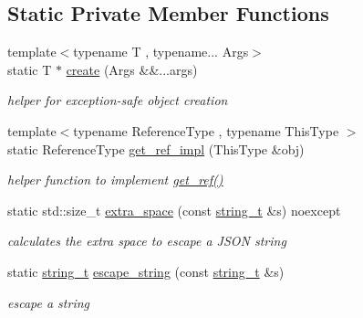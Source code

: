 \subsection*{Static Private Member Functions}
\begin{DoxyCompactItemize}
\item 
{\footnotesize template$<$typename T , typename... Args$>$ }\\static T $\ast$ \hyperlink{classnlohmann_1_1basic__json_a27df4303fbc83071275074486b54a40e}{create} (Args \&\&...args)
\begin{DoxyCompactList}\small\item\em helper for exception-\/safe object creation \end{DoxyCompactList}\item 
{\footnotesize template$<$typename Reference\+Type , typename This\+Type $>$ }\\static Reference\+Type \hyperlink{classnlohmann_1_1basic__json_a683cd53457a2a74dc82561e085381d8e}{get\+\_\+ref\+\_\+impl} (This\+Type \&obj)
\begin{DoxyCompactList}\small\item\em helper function to implement \hyperlink{classnlohmann_1_1basic__json_a4f332e90f3cae562d0c3fa6ba48f74f9}{get\+\_\+ref()} \end{DoxyCompactList}\item 
static std\+::size\+\_\+t \hyperlink{classnlohmann_1_1basic__json_a2dda20e69a1778aa8f69c08eb05db146}{extra\+\_\+space} (const \hyperlink{classnlohmann_1_1basic__json_ab63e618bbb0371042b1bec17f5891f42}{string\+\_\+t} \&s) noexcept
\begin{DoxyCompactList}\small\item\em calculates the extra space to escape a J\+S\+O\+N string \end{DoxyCompactList}\item 
static \hyperlink{classnlohmann_1_1basic__json_ab63e618bbb0371042b1bec17f5891f42}{string\+\_\+t} \hyperlink{classnlohmann_1_1basic__json_a287187938417b32a548e476058689d80}{escape\+\_\+string} (const \hyperlink{classnlohmann_1_1basic__json_ab63e618bbb0371042b1bec17f5891f42}{string\+\_\+t} \&s)
\begin{DoxyCompactList}\small\item\em escape a string \end{DoxyCompactList}\end{DoxyCompactItemize}
